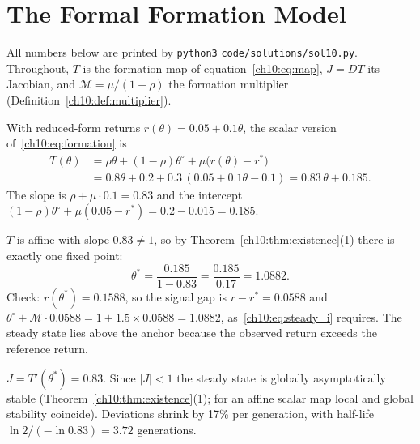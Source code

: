 \documentclass[../solutions_manual.tex]{subfiles}
\begin{document}
\ifSubfilesClassLoaded{\setcounter{chapter}{9}}{}%
\setcounter{chapter}{9}%
\chapter{The Formal Formation Model}\label{sol10}
\sloppy

All numbers below are printed by \texttt{python3} \nolinkurl{code/solutions/sol10.py}. Throughout, $T$ is the formation map of equation~\eqref{ch10:eq:map}, $J = DT$ its Jacobian, and $\mathcal{M} = \mu/(1-\rho)$ the formation multiplier (Definition~\ref{ch10:def:multiplier}).

 With reduced-form returns $r(\theta) = 0.05 + 0.1\theta$, the scalar version of~\eqref{ch10:eq:formation} is
\[
\begin{aligned}
T(\theta) &= \rho\theta + (1-\rho)\theta^{\circ} + \mu\big(r(\theta) - r^*\big)\\
&= 0.8\theta + 0.2 + 0.3\,(0.05 + 0.1\theta - 0.1) = 0.83\,\theta + 0.185 .
\end{aligned}
\]
The slope is $\rho + \mu\cdot 0.1 = 0.83$ and the intercept $(1-\rho)\theta^{\circ} + \mu(0.05 - r^*) = 0.2 - 0.015 = 0.185$.

 $T$ is affine with slope $0.83 \neq 1$, so by Theorem~\ref{ch10:thm:existence}(1) there is exactly one fixed point:
\[
\theta^* = \frac{0.185}{1 - 0.83} = \frac{0.185}{0.17} = 1.0882 .
\]
Check: $r(\theta^*) = 0.1588$, so the signal gap is $r - r^* = 0.0588$ and $\theta^{\circ} + \mathcal{M}\cdot 0.0588 = 1 + 1.5 \times 0.0588 = 1.0882$, as~\eqref{ch10:eq:steady_i} requires. The steady state lies above the anchor because the observed return exceeds the reference return.

 $J = T'(\theta^*) = 0.83$. Since $|J| < 1$ the steady state is globally asymptotically stable (Theorem~\ref{ch10:thm:existence}(1); for an affine scalar map local and global stability coincide). Deviations shrink by 17\% per generation, with half-life $\ln 2/(-\ln 0.83) = 3.72$ generations.
\end{document}
